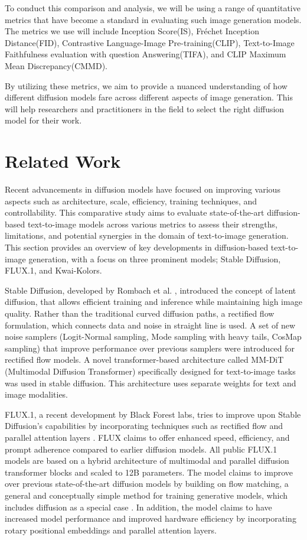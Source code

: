 \documentclass{article}
\begin{document}
To conduct this comparison and analysis, we will be using a range of quantitative metrics that have become a standard 
in evaluating such image generation models. The metrics we use will include Inception Score(IS), Fréchet Inception Distance(FID),
Contrastive Language-Image Pre-training(CLIP), Text-to-Image Faithfulness evaluation with question Answering(TIFA), and 
CLIP Maximum Mean Discrepancy(CMMD). 

By utilizing these metrics, we aim to provide a nuanced understanding of how different diffusion models fare across different aspects
of image generation. This will help researchers and practitioners in the field to select the right diffusion model for their work. 



\section{Related Work}
Recent advancements in diffusion models have focused on improving various aspects such as 
architecture, scale, efficiency, training techniques, and controllability. This comparative study aims to evaluate state-of-the-art 
diffusion-based text-to-image models across various metrics to assess their strengths, limitations, and potential synergies in the 
domain of text-to-image generation. This section provides an overview of key developments in diffusion-based text-to-image generation, 
with a focus on three prominent models; Stable Diffusion, FLUX.1, and Kwai-Kolors.

Stable Diffusion, developed by Rombach et al. \cite{kulal2024stablediffusion}, introduced the concept of latent diffusion, that allows efficient training 
and inference while maintaining high image quality. Rather than the traditional curved diffusion paths, a rectified flow formulation, which connects data and noise in straight line is used. A set of new noise samplers (Logit-Normal sampling, Mode sampling 
with heavy tails, CosMap sampling) that improve performance over previous samplers were introduced for rectified flow models. 
A novel transformer-based architecture called MM-DiT (Multimodal Diffusion Transformer) specifically designed for text-to-image 
tasks was used in stable diffusion. This architecture uses separate weights for text and image modalities.

FLUX.1, a recent development by Black Forest labs, tries to improve upon Stable Diffusion's capabilities by incorporating techniques such as rectified flow and parallel attention layers \cite{flux2024medium}. FLUX claims to offer enhanced speed, efficiency, 
and prompt adherence compared to earlier diffusion models. All public FLUX.1 models are based on a hybrid architecture of multimodal 
and parallel diffusion transformer blocks and scaled to 12B parameters. The model claims to improve over previous state-of-the-art diffusion 
models by building on flow matching, a general and conceptually simple method for training generative models, which includes 
diffusion as a special case \cite{flux2024main}. In addition, the model claims to have increased model performance and improved hardware efficiency by 
incorporating rotary positional embeddings and parallel attention layers.
\end{document}
